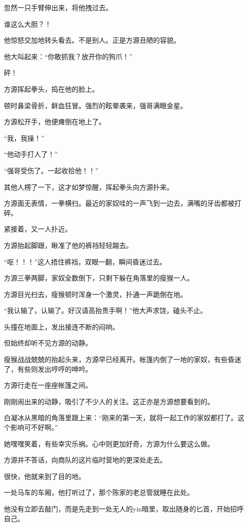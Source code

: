 \begin{this_body}
忽然一只手臂伸出来，将他拽过去。

谁这么大胆？！

他惊怒交加地转头看去。不是别人。正是方源丑陋的容貌。

他大叫起来：“你敢抓我？放开你的狗爪！”

砰！

方源挥起拳头，捣在他的脸上。

顿时鼻梁骨折，鲜血狂冒。强烈的眩晕袭来，强哥满眼金星。

方源松开手，他便瘫倒在地上了。

“我，我操！”

“他动手打人了！”

“强哥受伤了。一起收拾他！！”

其他人楞了一下，这才如梦惊醒，挥起拳头向方源扑来。

方源面无表情，一拳横扫。最近的家奴哇的一声飞到一边去，满嘴的牙齿都被打碎。

紧接着，又一人扑近。

方源抬起脚跟，瞅准了他的裤裆轻轻踹去。

“呕！！！”这人捂住裤裆，双眼一翻，瞬间昏迷过去。

方源三拳两脚，家奴全数倒下，只剩下躲在角落里的瘦猴一人。

方源目光扫去，瘦猴顿时浑身一个激灵，扑通一声跪倒在地。

“我认输了，认输了。好汉请高抬贵手啊！”他大声求饶，磕头不止。

头撞在地面上，发出接连不断的闷响。

但始终却听不见方源的动静。

瘦猴战战兢兢的抬起头来，方源早已经离开。帐篷内倒了一地的家奴，有些昏迷了，有些则发出哼哼的呻吟。

方源行走在一座座帐篷之间。

刚刚闹出来的动静，吸引了不少人的关注。这正亦是方源想要看到的。

白凝冰从黑暗的角落里跟上来：“刚来的第一天，就将一起工作的家奴都打了。这个影响可不好啊。”

她嘿嘿笑着，有些幸灾乐祸。心中则更加好奇，方源为什么要这么做。

方源并不答话，向商队的这片临时营地的更深处走去。

很快，他就来到了目的地。

一处马车的车厢，他打听过了，那个陈家的老总管就睡在此处。

他没有立即去敲门，而是先走到一处无人的yin暗里，取出随身的匕首，开始招呼自己。


\end{this_body}
